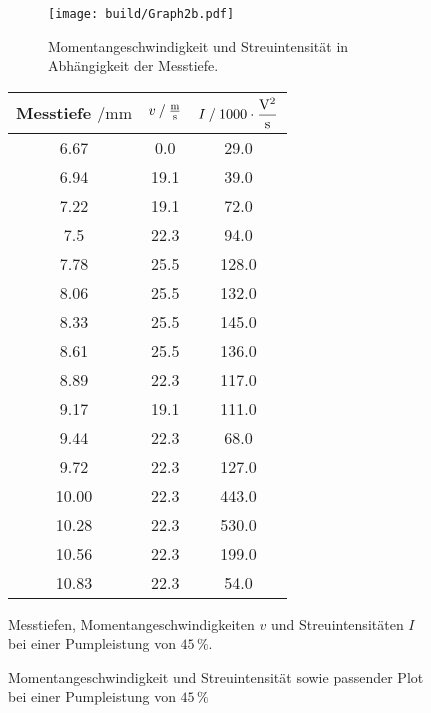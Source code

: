 \begin{figure}[H]
    \begin{subfigure}{0.57\textwidth} 
        \centering
        \texttt{[image: build/Graph2b.pdf]} 
        \caption{Momentangeschwindigkeit und Streuintensität in Abhängigkeit der Messtiefe.}
        \label{fig:graph2b}
        \qquad
    \end{subfigure}
    \begin{subtable}{0.43\textwidth}
        \centering
       \begin{tabular}{c c c}
        \toprule 
        {Messtiefe $\mathbin{/} \unit{\milli\meter}$} & {$v \mathbin{/} \unit{\frac{\meter}{\second}} $} & {$I \mathbin{/} 1000 \cdot \unit{\dfrac{\volt^2}{\second}}$}  \\
        \midrule 
        6.67      &  0.0      &29.0    \\
        6.94      &  19.1     &39.0    \\
        7.22      &  19.1     &72.0    \\
        7.5       &  22.3     &94.0    \\
        7.78      &  25.5     &128.0   \\
        8.06      &  25.5     &132.0   \\
        8.33      &  25.5     &145.0   \\
        8.61      &  25.5     &136.0   \\
        8.89      &  22.3     &117.0   \\
        9.17      &  19.1     &111.0   \\
        9.44      &  22.3     &68.0    \\
        9.72      &  22.3     &127.0   \\
        10.00     &  22.3     &443.0   \\
        10.28     &  22.3     &530.0   \\
        10.56     &  22.3     &199.0   \\
        10.83     &  22.3     &54.0    \\
        \bottomrule
    \end{tabular} 
    \caption{Messtiefen, Momentangeschwindigkeiten $v$ und Streuintensitäten $I$ bei einer Pumpleistung von $45 \,\%$.}
     \label{tab:2b}  
 \end{subtable}
 \caption{Momentangeschwindigkeit und Streuintensität sowie passender Plot bei einer Pumpleistung von $45 \,\%$} 
\end{figure}     




